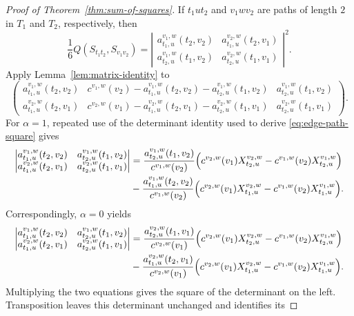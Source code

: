 \documentclass[pdflatex,sn-mathphys-num]{sn-jnl}
\theoremstyle{thmstyleone}
\begin{document}
\begin{proof}[Proof of Theorem~\ref{thm:sum-of-squares}]
If $t_1ut_2$ and $v_1wv_2$ are paths of length $2$ in $T_1$ and $T_2$,
respectively, then
\[
\frac16Q(S_{t_1t_2},S_{v_1v_2})=
\left|
\begin{matrix}
a_{t_1,u}^{v_1,w}(t_2,v_2)&a_{t_1,u}^{v_2,w}(t_2,v_1)\\
a_{t_2,u}^{v_1,w}(t_1,v_2)&a_{t_2,u}^{v_2,w}(t_1,v_1)
\end{matrix}
\right|^2.
\]
Apply Lemma~\ref{lem:matrix-identity} to
\begingroup
\small
\setlength{\arraycolsep}{12pt}
\renewcommand{\arraystretch}{1.12}
\[
\begin{pmatrix}
a_{t_1,u}^{v_1,w}(t_2,v_2)&
c^{v_1,w}(v_2)-a_{t_1,u}^{v_1,w}(t_2,v_2)-a_{t_2,u}^{v_1,w}(t_1,v_2)&
a_{t_2,u}^{v_1,w}(t_1,v_2)\\
a_{t_1,u}^{v_2,w}(t_2,v_1)&
c^{v_2,w}(v_1)-a_{t_1,u}^{v_2,w}(t_2,v_1)-a_{t_2,u}^{v_2,w}(t_1,v_1)&
a_{t_2,u}^{v_2,w}(t_1,v_1)
\end{pmatrix}.
\]
\endgroup
For $\alpha=1$, repeated use of the determinant identity used to derive
\eqref{eq:edge-path-square} gives
\begin{align*}
\left|
\begin{matrix}
a_{t_1,u}^{v_1,w}(t_2,v_2)&a_{t_2,u}^{v_1,w}(t_1,v_2)\\
a_{t_1,u}^{v_2,w}(t_2,v_1)&a_{t_2,u}^{v_2,w}(t_1,v_1)
\end{matrix}
\right|
&=\frac{a_{t_2,u}^{v_1,w}(t_1,v_2)}{c^{v_1,w}(v_2)}
\Bigl(c^{v_2,w}(v_1)X_{t_2,u}^{v_2,w}
-c^{v_1,w}(v_2)X_{t_2,u}^{v_1,w}\Bigr)                         \\
&-\frac{a_{t_1,u}^{v_1,w}(t_2,v_2)}{c^{v_1,w}(v_2)}
\Bigl(c^{v_2,w}(v_1)X_{t_1,u}^{v_2,w}
-c^{v_1,w}(v_2)X_{t_1,u}^{v_1,w}\Bigr).
\end{align*}
Correspondingly, $\alpha=0$ yields
\begin{align*}
\left|
\begin{matrix}
a_{t_1,u}^{v_1,w}(t_2,v_2)&a_{t_2,u}^{v_1,w}(t_1,v_2)\\
a_{t_1,u}^{v_2,w}(t_2,v_1)&a_{t_2,u}^{v_2,w}(t_1,v_1)
\end{matrix}
\right|
&=\frac{a_{t_2,u}^{v_2,w}(t_1,v_1)}{c^{v_2,w}(v_1)}
\Bigl(c^{v_2,w}(v_1)X_{t_2,u}^{v_2,w}
-c^{v_1,w}(v_2)X_{t_2,u}^{v_1,w}\Bigr)                         \\
&-\frac{a_{t_1,u}^{v_2,w}(t_2,v_1)}{c^{v_2,w}(v_1)}
\Bigl(c^{v_2,w}(v_1)X_{t_1,u}^{v_2,w}
-c^{v_1,w}(v_2)X_{t_1,u}^{v_1,w}\Bigr).
\end{align*}
Multiplying the two equations gives the square of the determinant on the
left.  Transposition leaves this determinant unchanged and identifies its

\end{proof}
\end{document}
